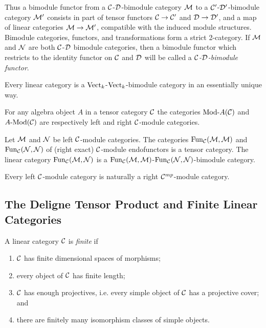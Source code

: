 \documentclass{amsart}
\begin{document}
Thus a bimodule functor from a $\mathcal C$-$\mathcal D$-bimodule category $\mathcal M$ to a $\mathcal C'$-$\mathcal D'$-bimodule category $\mathcal M'$ consists in part of tensor functors $\mathcal C \to \mathcal C'$ and $\mathcal D \to \mathcal D'$, and a map of linear categories $\mathcal M \to \mathcal M'$, compatible with the induced module structures. Bimodule categories, functors, and transformations form a strict 2-category. 	
If $\mathcal M$ and $\mathcal N$ are both $\mathcal C$-$\mathcal D$ bimodule categories, then a bimodule functor which restricts to the identity functor on $\mathcal C$ and $\mathcal D$ will be called a {\em $\mathcal C$-$\mathcal D$-bimodule functor}.

\begin{example}
	Every linear category is a $\mathrm{Vect}_k$-$\mathrm{Vect}_k$-bimodule category in an essentially unique way. 
\end{example}

\begin{example}
	For any algebra object $A$ in a tensor category $\mathcal C$ the categories $\Mod{}{A}(\cC)$ and $\Mod{A}{}(\cC)$ are respectively left and right $\mathcal C$-module categories. 
\end{example}

\begin{example}
	Let $\mathcal M$ and $\mathcal N$ be left $\mathcal C$-module categories. The categories $\operatorname{Fun}_{\mathcal C}(\mathcal M, \mathcal M)$ and $\operatorname{Fun}_{\mathcal C}(\mathcal N, \mathcal N)$ of (right exact) $\mathcal C$-module endofunctors is a tensor category. The linear category $\operatorname{Fun}_{\mathcal C}(\mathcal M, \mathcal N)$ is a $\operatorname{Fun}_{\mathcal C}(\mathcal M, \mathcal M)$-$\operatorname{Fun}_{\mathcal C}(\mathcal N, \mathcal N)$-bimodule category. 
\end{example}

\begin{remark}
 	Every left $\mathcal C$-module category is naturally a right $\mathcal C^{mp}$-module category. 
\end{remark}




\subsection{The Deligne Tensor Product and Finite Linear Categories}

\begin{definition} %
	A linear category $\mathcal C$ is {\em finite} if 
	\begin{enumerate}
		\item $\mathcal C$ has finite dimensional spaces of morphisms;
		\item every object of $\mathcal C$ has finite length;
		\item $\mathcal C$ has enough projectives, i.e. every simple object of $\mathcal C$ has a projective cover; and
		\item there are finitely many isomorphism classes of simple objects.  
	\end{enumerate}
\end{definition}
\end{document}
